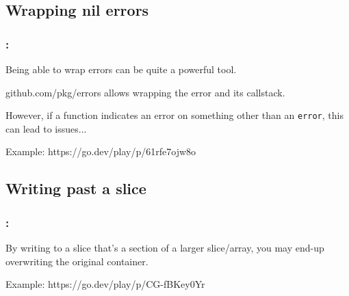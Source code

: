\subsection{Wrapping nil errors}

\begin{frame}
    \frametitle{\secname: \small\subsecname\normalsize}

    Being able to wrap errors can be quite a powerful tool. \break

    github.com/pkg/errors allows wrapping the error and its callstack. \break

    However, if a function indicates an error on something other than an \texttt{error}, this can lead to issues... \break

    Example: https://go.dev/play/p/61rfe7ojw8o
\end{frame}

\subsection{Writing past a slice}

\begin{frame}
    \frametitle{\secname: \small\subsecname\normalsize}

    By writing to a slice that's a section of a larger slice/array, you may end-up overwriting the original container. \break

    Example: https://go.dev/play/p/CG-fBKey0Yr
\end{frame}
